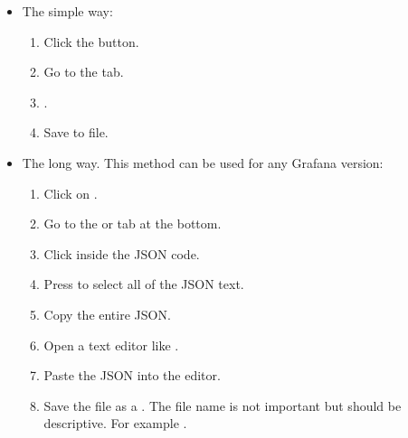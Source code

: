 \documentclass[letterpaper,10pt,english]{sphinxmanual}
\begin{document}
\begin{itemize}
\item {} 
The simple way:
\begin{enumerate}
\def\theenumi{\alph{enumi}}
\def\labelenumi{\theenumi .}
\makeatletter\def\p@enumii{\p@enumi \theenumi .}\makeatother
\item {} 
Click the  button.

\item {} 
Go to the  tab.

\item {} 
 .

\item {} 
Save to file.

\end{enumerate}

\item {} 
The long way. This method can be used for any Grafana version:
\begin{enumerate}
\def\theenumi{\alph{enumi}}
\def\labelenumi{\theenumi .}
\makeatletter\def\p@enumii{\p@enumi \theenumi .}\makeatother
\item {} 
Click on .

\item {} 
Go to the  or  tab at the bottom.

\item {} 
Click inside the JSON code.

\item {} 
Press  to select all of the JSON text.

\item {} 
Copy the entire JSON.

\item {} 
Open a text editor like .

\item {} 
Paste the JSON into the editor.

\item {} 
Save the file as a . The file name is not important but
should be descriptive. For example .

\end{enumerate}

\end{itemize}
\end{document}
